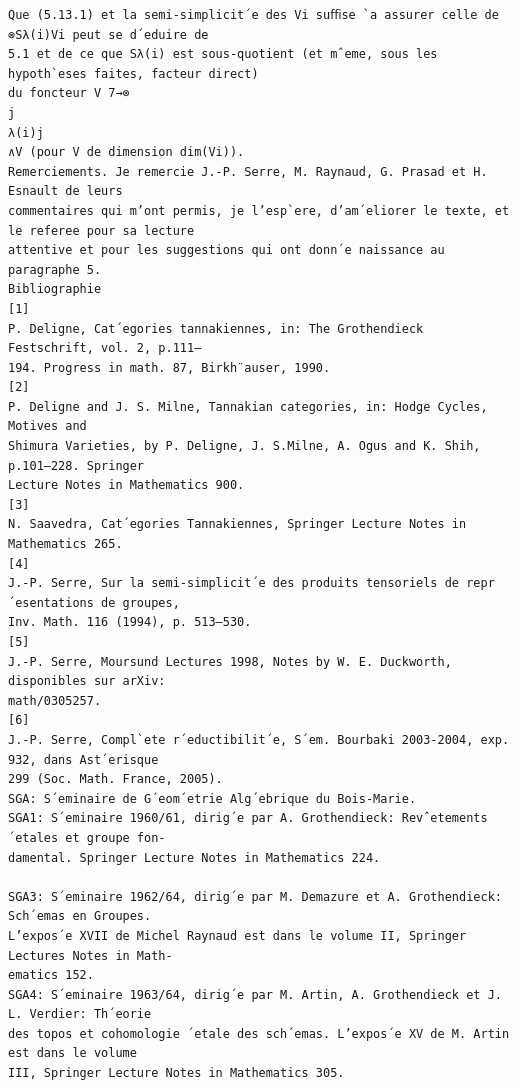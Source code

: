 \documentclass[10pt]{article}
\begin{document}
\begin{verbatim}
Que (5.13.1) et la semi-simplicit´e des Vi suﬃse `a assurer celle de ⊗Sλ(i)Vi peut se d´eduire de
5.1 et de ce que Sλ(i) est sous-quotient (et mˆeme, sous les hypoth`eses faites, facteur direct)
du foncteur V 7→⊗
j
λ(i)j
∧V (pour V de dimension dim(Vi)).
Remerciements. Je remercie J.-P. Serre, M. Raynaud, G. Prasad et H. Esnault de leurs
commentaires qui m’ont permis, je l’esp`ere, d’am´eliorer le texte, et le referee pour sa lecture
attentive et pour les suggestions qui ont donn´e naissance au paragraphe 5.
Bibliographie
[1]
P. Deligne, Cat´egories tannakiennes, in: The Grothendieck Festschrift, vol. 2, p.111–
194. Progress in math. 87, Birkh¨auser, 1990.
[2]
P. Deligne and J. S. Milne, Tannakian categories, in: Hodge Cycles, Motives and
Shimura Varieties, by P. Deligne, J. S.Milne, A. Ogus and K. Shih, p.101–228. Springer
Lecture Notes in Mathematics 900.
[3]
N. Saavedra, Cat´egories Tannakiennes, Springer Lecture Notes in Mathematics 265.
[4]
J.-P. Serre, Sur la semi-simplicit´e des produits tensoriels de repr´esentations de groupes,
Inv. Math. 116 (1994), p. 513–530.
[5]
J.-P. Serre, Moursund Lectures 1998, Notes by W. E. Duckworth, disponibles sur arXiv:
math/0305257.
[6]
J.-P. Serre, Compl`ete r´eductibilit´e, S´em. Bourbaki 2003-2004, exp. 932, dans Ast´erisque
299 (Soc. Math. France, 2005).
SGA: S´eminaire de G´eom´etrie Alg´ebrique du Bois-Marie.
SGA1: S´eminaire 1960/61, dirig´e par A. Grothendieck: Revˆetements ´etales et groupe fon-
damental. Springer Lecture Notes in Mathematics 224.

SGA3: S´eminaire 1962/64, dirig´e par M. Demazure et A. Grothendieck: Sch´emas en Groupes.
L’expos´e XVII de Michel Raynaud est dans le volume II, Springer Lectures Notes in Math-
ematics 152.
SGA4: S´eminaire 1963/64, dirig´e par M. Artin, A. Grothendieck et J. L. Verdier: Th´eorie
des topos et cohomologie ´etale des sch´emas. L’expos´e XV de M. Artin est dans le volume
III, Springer Lecture Notes in Mathematics 305.
\end{verbatim}
\end{document}
